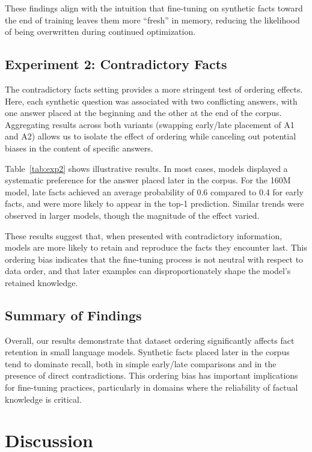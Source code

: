 \documentclass[11pt]{article}
\begin{document}
These findings align with the intuition that fine-tuning on synthetic facts toward the end of training leaves them more “fresh” in memory, reducing the likelihood of being overwritten during continued optimization.

\subsection{Experiment 2: Contradictory Facts}
The contradictory facts setting provides a more stringent test of ordering effects. Here, each synthetic question was associated with two conflicting answers, with one answer placed at the beginning and the other at the end of the corpus. Aggregating results across both variants (swapping early/late placement of A1 and A2) allows us to isolate the effect of ordering while canceling out potential biases in the content of specific answers.

Table~\ref{tab:exp2} shows illustrative results. In most cases, models displayed a systematic preference for the answer placed later in the corpus. For the 160M model, late facts achieved an average probability of 0.6 compared to 0.4 for early facts, and were more likely to appear in the top-1 prediction. Similar trends were observed in larger models, though the magnitude of the effect varied.

These results suggest that, when presented with contradictory information, models are more likely to retain and reproduce the facts they encounter last. This ordering bias indicates that the fine-tuning process is not neutral with respect to data order, and that later examples can disproportionately shape the model’s retained knowledge.

\subsection{Summary of Findings}
Overall, our results demonstrate that dataset ordering significantly affects fact retention in small language models. Synthetic facts placed later in the corpus tend to dominate recall, both in simple early/late comparisons and in the presence of direct contradictions. This ordering bias has important implications for fine-tuning practices, particularly in domains where the reliability of factual knowledge is critical.



\section{Discussion}
\end{document}
